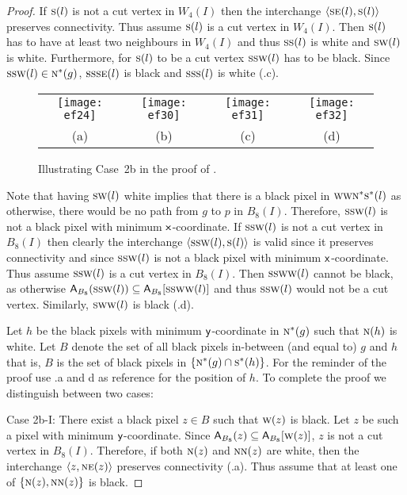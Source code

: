 \documentclass[lotsofwhite,charterfonts]{patmorin}
\newcommand{\N}{\textsc{n}}
\newcommand{\NE}{\textsc{ne}}
\newcommand{\SE}{\textsc{se}}
\renewcommand{\S}{\textsc{s}}
\newcommand{\SW}{\textsc{sw}}
\newcommand{\W}{\textsc{w}}
\newcommand{\x}{\ensuremath{\protect\textup{\textsf{x}}}}
\newcommand{\y}{\ensuremath{\protect\textup{\textsf{y}}}}
\newcommand{\ic}[2]{\langle #1,#2 \rangle}
\newcommand{\A}[2]{\ensuremath{\protect\textup{\textsf{A}}_{#2}(#1)}}
\newcommand{\AC}[2]{\ensuremath{\protect\textup{\textsf{A}}_{#2}[#1]}}
\newcommand{\se}{\ensuremath{\subseteq}}
\begin{document}
\begin{proof}
If $\S(l)$ is not a cut vertex in $W_4(I)$ then the interchange $\ic{\SE(l)}{\S(l)}$ preserves connectivity. Thus assume $\S(l)$ is a cut vertex in $W_4(I)$. Then $\S(l)$ has to have at least two neighbours in $W_4(I)$ and thus $\S\S(l)$ is white and $\SW(l)$ is white.  Furthermore, for $\S(l)$ to be a cut vertex $\S\SW(l)$ has to be black. Since $\S\SW(l)\in \N^*(g)$, $\S\S\SE(l)$ is black and $\S\S\S(l)$ is white (.c).
 
\begin{figure}[htbp]
\begin{center}
\begin{tabular}{cccc}
\texttt{[image: ef24]} &
\texttt{[image: ef30]} &
\texttt{[image: ef31]} & 
\texttt{[image: ef32]}\\
(a) & (b) & (c) & (d)
\end{tabular}
\end{center}
\caption{Illustrating Case~2b in the proof of .}
\end{figure}

Note that having $\SW(l)$ white implies that there is a black pixel in $\W\W\N^*\S^*(l)$ as otherwise, there would be no path from $g$ to $p$ in $B_8(I)$. Therefore, $\S\S\W(l)$ is not a black pixel with  minimum \x-coordinate. If $\S\S\W(l)$ is not a cut vertex in $B_8(I)$ then clearly the interchange $\ic{\S\S\W(l)}{\S(l)}$ is valid since it preserves connectivity and  since $\S\S\W(l)$ is not a black pixel with minimum \x-coordinate. Thus assume $\S\S\W(l)$ is a cut vertex in $B_8(I)$. Then $\S\S\W\W(l)$ cannot be black, as otherwise $\A{\S\S\W(l)}{B_8}\se \AC{\S\S\W\W(l)}{B_8}$ and thus $\S\S\W(l)$ would not be a cut vertex. Similarly, $\S\W\W(l)$ is black (.d). 

Let $h$ be the black pixels with minimum \y-coordinate in $\N^*(g)$ such that $\N(h)$ is white. Let $B$ denote the set of all black pixels in-between (and equal to) $g$ and $h$ that is, $B$ is the set of black pixels in $\{\N^*(g)\cap \S^*(h)\}$. For the reminder of the proof use .a and d as reference for the position of $h$. To complete the proof we distinguish between two cases: 


\noindent Case 2b-I: There exist a black pixel $z\in B$ such that $\W(z)$ is black. Let $z$ be such a pixel with minimum \y-coordinate. Since $\A{z}{B_8}\se \AC{\W(z)}{B_8}$, $z$ is not a cut vertex in $B_8(I)$. Therefore, if both  $\N(z)$ and  $\N\N(z)$ are white, then the interchange $\ic{z}{\NE(z)}$ preserves connectivity  (.a). Thus assume that at least one of $\{\N(z),\N\N(z)\}$ is black. 



\end{proof}
\end{document}
